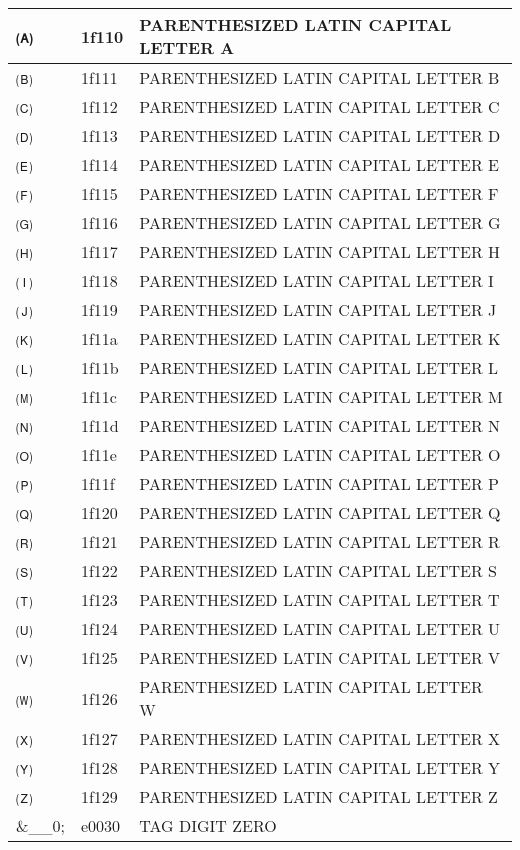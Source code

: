 \documentclass[12pt,letterpaper,openany]{book}
\begin{document}
\begin{center}
\begin{supertabular}{|m{0.25in}|m{0.5in}|m{4in}|}
🄐 & 1f110 & PARENTHESIZED LATIN CAPITAL LETTER A\\\hline
🄑 & 1f111 & PARENTHESIZED LATIN CAPITAL LETTER B\\\hline
🄒 & 1f112 & PARENTHESIZED LATIN CAPITAL LETTER C\\\hline
🄓 & 1f113 & PARENTHESIZED LATIN CAPITAL LETTER D\\\hline
🄔 & 1f114 & PARENTHESIZED LATIN CAPITAL LETTER E\\\hline
🄕 & 1f115 & PARENTHESIZED LATIN CAPITAL LETTER F\\\hline
🄖 & 1f116 & PARENTHESIZED LATIN CAPITAL LETTER G\\\hline
🄗 & 1f117 & PARENTHESIZED LATIN CAPITAL LETTER H\\\hline
🄘 & 1f118 & PARENTHESIZED LATIN CAPITAL LETTER I\\\hline
🄙 & 1f119 & PARENTHESIZED LATIN CAPITAL LETTER J\\\hline
🄚 & 1f11a & PARENTHESIZED LATIN CAPITAL LETTER K\\\hline
🄛 & 1f11b & PARENTHESIZED LATIN CAPITAL LETTER L\\\hline
🄜 & 1f11c & PARENTHESIZED LATIN CAPITAL LETTER M\\\hline
🄝 & 1f11d & PARENTHESIZED LATIN CAPITAL LETTER N\\\hline
🄞 & 1f11e & PARENTHESIZED LATIN CAPITAL LETTER O\\\hline
🄟 & 1f11f & PARENTHESIZED LATIN CAPITAL LETTER P\\\hline
🄠 & 1f120 & PARENTHESIZED LATIN CAPITAL LETTER Q\\\hline
🄡 & 1f121 & PARENTHESIZED LATIN CAPITAL LETTER R\\\hline
🄢 & 1f122 & PARENTHESIZED LATIN CAPITAL LETTER S\\\hline
🄣 & 1f123 & PARENTHESIZED LATIN CAPITAL LETTER T\\\hline
🄤 & 1f124 & PARENTHESIZED LATIN CAPITAL LETTER U\\\hline
🄥 & 1f125 & PARENTHESIZED LATIN CAPITAL LETTER V\\\hline
🄦 & 1f126 & PARENTHESIZED LATIN CAPITAL LETTER W\\\hline
🄧 & 1f127 & PARENTHESIZED LATIN CAPITAL LETTER X\\\hline
🄨 & 1f128 & PARENTHESIZED LATIN CAPITAL LETTER Y\\\hline
🄩 & 1f129 & PARENTHESIZED LATIN CAPITAL LETTER Z\\\hline
\&\_\_0; & e0030 & TAG DIGIT ZERO\\\hline

\end{supertabular}
\end{center}
\end{document}
